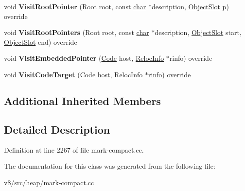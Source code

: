 \begin{DoxyCompactItemize}
void {\bfseries Visit\+Root\+Pointer} (Root root, const \mbox{\hyperlink{classchar}{char}} $\ast$description, \mbox{\hyperlink{classv8_1_1internal_1_1ObjectSlot}{Object\+Slot}} p) override
\item 
\mbox{\label{classv8_1_1internal_1_1PointersUpdatingVisitor_a403d10b03e697d1499d80d145e874202}} 
void {\bfseries Visit\+Root\+Pointers} (Root root, const \mbox{\hyperlink{classchar}{char}} $\ast$description, \mbox{\hyperlink{classv8_1_1internal_1_1ObjectSlot}{Object\+Slot}} start, \mbox{\hyperlink{classv8_1_1internal_1_1ObjectSlot}{Object\+Slot}} end) override
\item 
\mbox{\label{classv8_1_1internal_1_1PointersUpdatingVisitor_af2d1b0ac2924355275045a3e91933e14}} 
void {\bfseries Visit\+Embedded\+Pointer} (\mbox{\hyperlink{classv8_1_1internal_1_1Code}{Code}} host, \mbox{\hyperlink{classv8_1_1internal_1_1RelocInfo}{Reloc\+Info}} $\ast$rinfo) override
\item 
\mbox{\label{classv8_1_1internal_1_1PointersUpdatingVisitor_a73fc233b37577e745363789170077c75}} 
void {\bfseries Visit\+Code\+Target} (\mbox{\hyperlink{classv8_1_1internal_1_1Code}{Code}} host, \mbox{\hyperlink{classv8_1_1internal_1_1RelocInfo}{Reloc\+Info}} $\ast$rinfo) override
\end{DoxyCompactItemize}
\subsection*{Additional Inherited Members}


\subsection{Detailed Description}


Definition at line 2267 of file mark-\/compact.\+cc.



The documentation for this class was generated from the following file\+:\begin{DoxyCompactItemize}
\item 
v8/src/heap/mark-\/compact.\+cc\end{DoxyCompactItemize}
